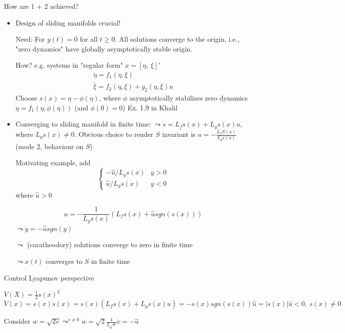How are 1 + 2 achieved?
\begin{itemize}
\item Design of sliding manifolds crucial!

Need: For $y(t)=0$ for all $t \geq 0$. All solutions converge to the origin, i.e., "zero dynamics" have globally asymptotically stable origin.

How? e.g. systems in "regular form"
$x = \left[ \eta, \ \xi \right]'$ 
\begin{equation*}
\begin{array}{l}
     \dot{\eta} = f_1(\eta, \xi)\\
     \dot{\xi} = f_2(\eta, \xi) + g_2(\eta,\xi) u
\end{array}
\end{equation*}
Choose $s(x)=\eta - \phi(\eta)$, where $\phi$ asymptotically stabilizes zero dynamics $\dot{\eta} = f_1(\eta, \phi(\eta))$ (and $\phi(0) = 0$)
Ex. 1.9 in Khalil
\item Converging to sliding manifold in finite time:
$\leadsto \dot{s} = L_fs(x) + L_gs(x)u$, where $L_gs(x) \neq 0$. Obvious choice to render $S$ invariant is $u = - \frac{L_fS(x)}{L_gs(x)}$ (mode 2, behaviour on $S$)

Motivating example, add 
\begin{equation*}
\left \{ \begin{array}{ll}
     - \hat{u}/ L_gs(x) & y > 0 \\
     \hat{u} /L_gs(x) & y < 0
\end{array} \right.
\end{equation*}
where $\hat{u} > 0$

\begin{equation*}
 u = - \frac{1}{L_gs(x)}(L_fs(x) + \hat{u}sgn(s(x)))
\end{equation*}
$\leadsto \dot{y} = - \hat{u} sgn(y)$

$\leadsto $ (caratheodory) solutions converge to zero in finite time

$\leadsto x(t)$ converges to $S$ in finite time
\end{itemize}

Control Lyapunov perspective

$V(X) = \frac{1}{2}s(x)^2$
\begin{equation*}
\dot{V}(x) = s(x) \dot{s}(x) = s(x)(L_fs(x)+L_gs(x)u) = -s(x)sgn(s(x))\hat{u} = | s(x)|\hat{u} < 0,\ s(x) \neq 0
\end{equation*}

Consider $w = \sqrt{2v} \leadsto^{s \neq 0} \dot{w} = \sqrt{2}\frac{1}{2\sqrt{v}}\dot{v}=-\hat{u}$

